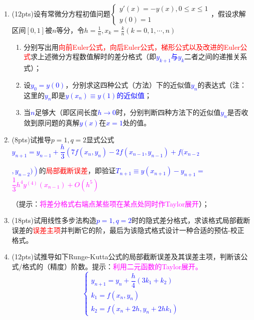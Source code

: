 \documentclass[cn,hazy,green,11pt,normal]{elegantnote}
\begin{document}
        \begin{enumerate}
            \item (12pts)设有常微分方程初值问题$\begin{cases}y'(x)=-y(x),0\leq x\leq 1\\y(0)=1\end{cases}$，假设求解区间$[0,1]$被$n$等分，令$h=\frac1n,x_k=\frac kn(k=0,1,\cdots,n)$
                \begin{enumerate}
                    \item 分别写出用\textcolor{red}{向前Euler公式，向后Euler公式，梯形公式以及改进的Euler公式}求上述微分方程数值解时的差分格式（即\textcolor{blue}{$y_{k+1}$与$y_k$}二者之间的递推关系式）；
                    \item 设\textcolor{blue}{$y_0=y(0)$}，分别求这四种公式（方法）下的近似值\textcolor{blue}{$y_n$}的表达式（注：这里的\textcolor{blue}{$y_n$}即是\textcolor{blue}{$y(x_n)\equiv y(1)$的近似值}；
                    \item 当\textcolor{blue}{$n$}足够大（即区间长度\textcolor{blue}{$h\rightarrow 0$}时，分别判断四种方法下的近似值\textcolor{blue}{$y_n$}是否收敛到原问题的真解\textcolor{blue}{$y(x)$}在\textcolor{blue}{$x=1$}处的值。
                \end{enumerate}

            \item (8pts)试推导$p=1,q=2$显式公式\textcolor{blue}{$y_{n+1}=y_{n-1}+\dfrac h3\left(7f(x_n,y_n)-2f(x_{n-1},y_{n-1})+f(x_{n-2}\right.$}

                 \textcolor{blue}{$\left.,y_{n-2})\right)$}的\textcolor{red}{局部截断误差}，即验证\textcolor{blue}{$T_{n+1}\equiv y(x_{n+1})-y_{n+1}=\,\,$}\textcolor{magenta}{$\dfrac13 h^4 y^{(4)}(x_{n-1})+O(h^5)$}

                （提示：\textcolor{magenta}{将差分格式右端点某些项在某点处同时作Taylor展开}）；
            \item (18pts)试用线性多步法构造\textcolor{blue}{$p=1,q=2$}时的隐式差分格式，求该格式局部截断误差的\textcolor{red}{误差主项}并判断它的阶，最后为该隐式格式设计一种合适的预估-校正格式。
            \item (12pts)试推导如下Runge-Kutta公式的局部截断误差及其误差主项，判断该公式/格式的（精度）阶数。提示：\textcolor{magenta}{利用二元函数的Taylor展开。}
                \textcolor{blue}{\[\begin{cases}y_{n+1}=y_n+\dfrac h4(3k_1+k_2)\\k_1=f(x_n,y_n)\\k_2=f(x_n+2h,y_n+2hk_1)\end{cases}\]}

        \end{enumerate}
\end{document}
